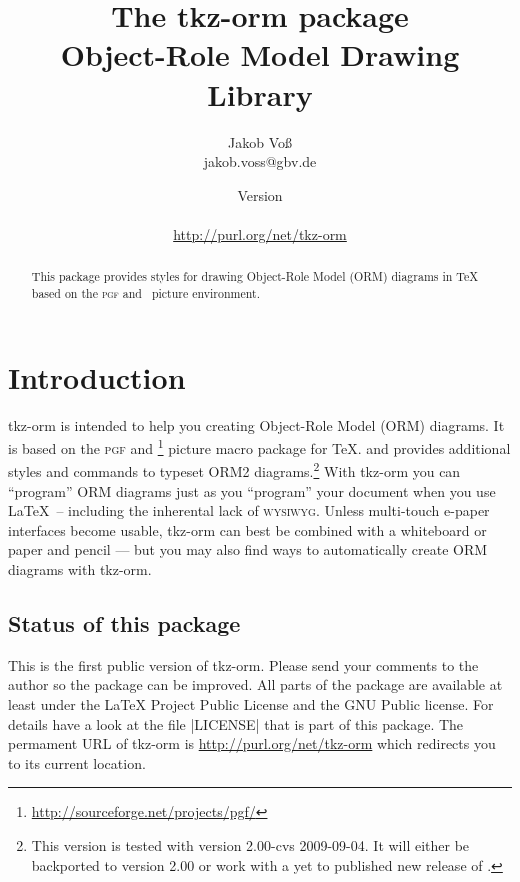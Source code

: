 \documentclass[a4paper,10pt]{article}
\title{The \textsf{tkz-orm} package\\Object-Role Model Drawing Library}
\author{Jakob Vo\ss\\{\footnotesize jakob.voss@gbv.de}}
\date{Version \ormVersion\\\ormDate\\[5mm]\url{http://purl.org/net/tkz-orm}}
\begin{document}
\maketitle

\begin{abstract}
This package provides styles for drawing Object-Role Model (ORM)
diagrams in \TeX{} based on the \textsc{pgf} and \tikzname\ picture environment.
\end{abstract}

\tableofcontents
\pagebreak

\section{Introduction}
\label{sec:introduction}

\textsf{tkz-orm} is intended to help you creating Object-Role Model (ORM) diagrams. It is based on the \textsc{pgf} and \tikzname\footnote{\url{http://sourceforge.net/projects/pgf/}} picture macro package for \TeX. and provides additional styles and commands to typeset ORM2 diagrams.\footnote{This version is tested with \tikzname{} version 2.00-cvs 2009-09-04. It will either be backported to \tikzname{} version 2.00 or work with a yet to published new release of \tikzname{}.} With \textsf{tkz-orm} you can ``program'' ORM diagrams just as you ``program'' your document when you use \LaTeX\ -- including the inherental lack of \textsc{wysiwyg}. Unless multi-touch e-paper interfaces become usable, \textsf{tkz-orm} can best be combined with a whiteboard or paper and pencil --- but you may also find ways to automatically create ORM diagrams with \textsf{tkz-orm}.

\subsection*{Status of this package}
This is the first public version of \textsf{tkz-orm}. Please send your comments to the author so the package can be improved. All parts of the package are available at least under the \LaTeX{} Project Public License\cite{LPPL} and the GNU Public license\cite{GPL2}. For details have a look at the file |LICENSE| that is part of this package. The permament URL of \textsf{tkz-orm} is \url{http://purl.org/net/tkz-orm} which redirects you to its current location.
\end{document}
